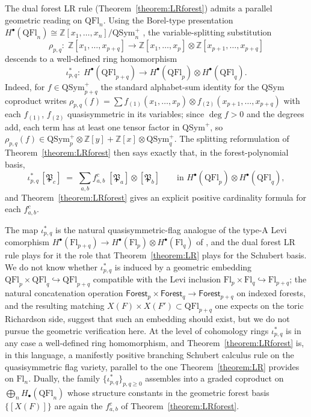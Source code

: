 \documentclass[a4paper,fleqn]{cas-sc}
\theoremstyle{definition}
\theoremstyle{remark}
\numberwithin{equation}{subsection}
\newcommand{\forest}{\mathfrak{P}}
\begin{document}
The dual forest LR rule (Theorem~\ref{theorem:LRforest}) admits a parallel geometric reading on $\mathrm{QFl}_n$. Using the Borel-type presentation $H^\bullet(\mathrm{QFl}_n)\cong \mathbb{Z}[x_1,\ldots,x_n]/\mathrm{QSym}_n^+$ \cite[Theorem~A and Corollary~12.5]{bergeron2025qsymflag}, the variable-splitting substitution
$$\rho_{p,q}:\;\mathbb{Z}[x_1,\ldots,x_{p+q}]\longrightarrow \mathbb{Z}[x_1,\ldots,x_p]\otimes \mathbb{Z}[x_{p+1},\ldots,x_{p+q}]$$
descends to a well-defined ring homomorphism
$$\iota_{p,q}^*:\;H^\bullet(\mathrm{QFl}_{p+q})\longrightarrow H^\bullet(\mathrm{QFl}_p)\otimes H^\bullet(\mathrm{QFl}_q).$$
Indeed, for $f\in\mathrm{QSym}_{p+q}^+$ the standard alphabet-sum identity for the QSym coproduct writes $\rho_{p,q}(f) = \sum f_{(1)}(x_1,\ldots,x_p)\otimes f_{(2)}(x_{p+1},\ldots,x_{p+q})$ with each $f_{(1)}$, $f_{(2)}$ quasisymmetric in its variables; since $\deg f>0$ and the degrees add, each term has at least one tensor factor in $\mathrm{QSym}^+$, so $\rho_{p,q}(f)\in \mathrm{QSym}_p^+\otimes\mathbb{Z}[y] + \mathbb{Z}[x]\otimes \mathrm{QSym}_q^+$. The splitting reformulation of Theorem~\ref{theorem:LRforest} then says exactly that, in the forest-polynomial basis,
$$\iota_{p,q}^*\,[\forest_c] \;=\; \sum_{a,b} f_{a,b}^c\;[\forest_a]\otimes [\forest_b]\qquad\text{in } H^\bullet(\mathrm{QFl}_p)\otimes H^\bullet(\mathrm{QFl}_q),$$
and Theorem~\ref{theorem:LRforest} gives an explicit positive cardinality formula for each $f_{a,b}^c$.

The map $\iota_{p,q}^*$ is the natural quasisymmetric-flag analogue of the type-A Levi comorphism $H^\bullet(\mathrm{Fl}_{p+q})\to H^\bullet(\mathrm{Fl}_p)\otimes H^\bullet(\mathrm{Fl}_q)$ of \cite{ressayre2009branching}, and the dual forest LR rule plays for it the role that Theorem~\ref{theorem:LR} plays for the Schubert basis. We do not know whether $\iota_{p,q}^*$ is induced by a geometric embedding $\mathrm{QFl}_p\times \mathrm{QFl}_q\hookrightarrow \mathrm{QFl}_{p+q}$ compatible with the Levi inclusion $\mathrm{Fl}_p\times \mathrm{Fl}_q\hookrightarrow \mathrm{Fl}_{p+q}$; the natural concatenation operation $\mathsf{Forest}_p\times \mathsf{Forest}_q\to \mathsf{Forest}_{p+q}$ on indexed forests, and the resulting matching $X(F)\times X(F')\subset \mathrm{QFl}_{p+q}$ one expects on the toric Richardson side, suggest that such an embedding should exist, but we do not pursue the geometric verification here. At the level of cohomology rings $\iota_{p,q}^*$ is in any case a well-defined ring homomorphism, and Theorem~\ref{theorem:LRforest} is, in this language, a manifestly positive branching Schubert calculus rule on the quasisymmetric flag variety, parallel to the one Theorem~\ref{theorem:LR} provides on $\mathrm{Fl}_n$. Dually, the family $\{\iota_{p,q}^*\}_{p,q\geq 0}$ assembles into a graded coproduct on $\bigoplus_n H_\bullet(\mathrm{QFl}_n)$ whose structure constants in the geometric forest basis $\{[X(F)]\}$ are again the $f_{a,b}^c$ of Theorem~\ref{theorem:LRforest}.
\end{document}
